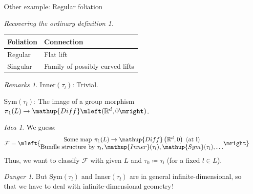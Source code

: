 \documentclass[hyperref={pdfpagelabels=false}]{beamer}
\def\bes{\begin{equation*}}
\def\ees{\end{equation*}}
\theoremstyle{plain}
\theoremstyle{remark}
\newtheorem*{remark}{Remarks}
\newtheorem*{idea}{Idea}
\newtheorem*{danger}{Danger}
\newtheorem*{BackToTheRoots}{Recovering the ordinary definition}
\begin{document}
{

\begin{frame}{Other example: Regular foliation}
\begin{figure}
\end{figure}

\begin{BackToTheRoots}
	\centering
		\begin{tabular}{l|l}
			Foliation & Connection \\ \hline
			Regular & Flat lift \\
			Singular & Family of possibly curved lifts
		\end{tabular}
\end{BackToTheRoots}

\begin{remark}
$\mathup{Inner}(\tau_l)$: Trivial.

$\mathup{Sym}(\tau_l)$: The image of a group morphism $\pi_1(L) \to \mathup{Diff}\mleft( \mathbb{R}^d, 0 \mright)$.
\end{remark}
\end{frame}

\begin{frame}
\begin{idea}
	We guess:
	\bes
		\mathcal{F}
		=
		\mleft\{
			\begin{matrix}
				\text{Some map } \pi_1(L) \to \mathup{Diff}\left( \mathbb{R}^d, 0 \right) \text{ (at l)}
				\\
				\text{Bundle structure by } \tau_l, \mathup{Inner}(\tau_l), \mathup{Sym}(\tau_l), \dots
			\end{matrix}
		\mright\}
	\ees
	Thus, we want to classify $\mathcal{F}$ with given $L$ and $\tau_0 \coloneqq \tau_l$ (for a fixed $l \in L$).
\end{idea}

\pause

\begin{danger}
But $\mathup{Sym}(\tau_l)$ and $\mathup{Inner}(\tau_l)$ are in general infinite-dimensional, so that we have to deal with infinite-dimensional geometry!
\end{danger}
\end{frame}

}
\end{document}
